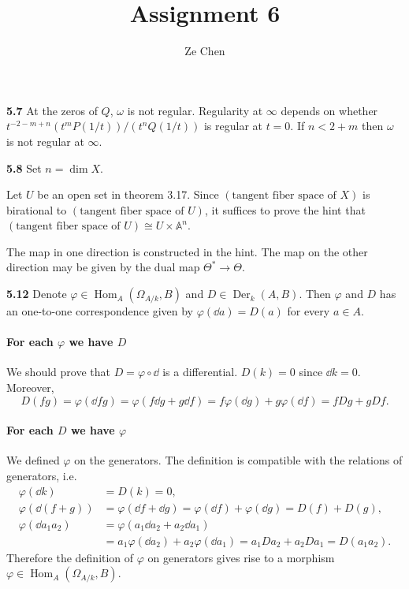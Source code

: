 \documentclass{article}
\title{Assignment 6}
\author{Ze Chen}
\makeatletter
\newcommand*{\shifttext}[1]{%
  \settowidth{\@tempdima}{#1}%
  \hspace{-\@tempdima}#1%
}
\newcommand{\plabel}[1]{%
\shifttext{\textbf{#1}\quad}%
}
\makeatother
\begin{document}
\maketitle

\plabel{5.7}%
At the zeros of $Q$, $\omega$ is not regular.
Regularity at $\infty$ depends on whether $t^{-2-m+n} (t^m P(1/t))/(t^n Q(1/t))$ is regular at $t=0$.
If $n<2+m$ then $\omega$ is not regular at $\infty$.

\plabel{5.8}%
Set $n = \dim X$.
\par
Let $U$ be an open set in theorem 3.17.
Since $(\text{tangent fiber space of $X$})$ is birational to $(\text{tangent fiber space of $U$})$, it suffices to prove the hint that $(\text{tangent fiber space of $U$}) \cong U\times \mathbb{A}^n$.
\par
The map in one direction is constructed in the hint.
The map on the other direction may be given by the dual map $\Theta^* \to \Theta$.

\plabel{5.12}%
Denote $\varphi \in \operatorname{Hom}_A(\Omega_{A/k},B)$ and $D \in \operatorname{Der}_{k}(A,B)$.
Then $\varphi$ and $D$ has an one-to-one correspondence given by $\varphi(\dd{a}) = D(a)$ for every $a\in A$.
\paragraph*{For each $\varphi$ we have $D$}
We should prove that $D = \varphi \circ \dd$ is a differential.
$D(k) = 0$ since $\dd{k} = 0$.
Moreover,
\[ D(fg) = \varphi(\dd{fg}) = \varphi(f\dd{g} + g\dd{f}) = f\varphi(\dd{g}) + g\varphi(\dd{f}) = fDg+gDf. \]
\paragraph*{For each $D$ we have $\varphi$}
We defined $\varphi$ on the generators.
The definition is compatible with the relations of generators, i.e.
\begin{align*}
    \varphi(\dd{k}) &= D(k) = 0, \\
    \varphi(\dd(f+g)) &= \varphi(\dd{f}+\dd{g}) = \varphi(\dd{f}) + \varphi(\dd{g}) = D(f) + D(g), \\
    \varphi(\dd{a_1 a_2}) &= \varphi(a_1 \dd{a_2} + a_2 \dd{a_1}) \\ &= a_1 \varphi(\dd{a_2}) + a_2 \varphi(\dd{a_1}) = a_1 D a_2 + a_2 D a_1 = D(a_1 a_2).
\end{align*}
Therefore the definition of $\varphi$ on generators gives rise to a morphism $\varphi \in \operatorname{Hom}_A(\Omega_{A/k},B)$.
\end{document}
